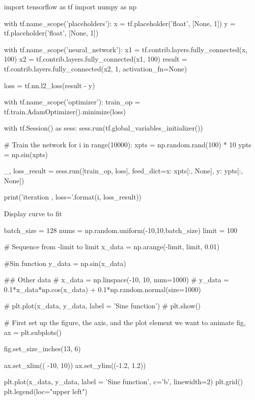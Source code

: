 %
%
%



import tensorflow as tf
import numpy as np

with tf.name_scope('placeholders'):
x = tf.placeholder('float', [None, 1])
y = tf.placeholder('float', [None, 1])

with tf.name_scope('neural_network'):
x1 = tf.contrib.layers.fully_connected(x, 100)
x2 = tf.contrib.layers.fully_connected(x1, 100)
result = tf.contrib.layers.fully_connected(x2, 1,
activation_fn=None)

loss = tf.nn.l2_loss(result - y)

with tf.name_scope('optimizer'):
train_op = tf.train.AdamOptimizer().minimize(loss)

with tf.Session() as sess:
sess.run(tf.global_variables_initializer())

# Train the network
for i in range(10000):
xpts = np.random.rand(100) * 10
ypts = np.sin(xpts)

_, loss_result = sess.run([train_op, loss],
feed_dict={x: xpts[:, None],
    y: ypts[:, None]})

print('iteration {}, loss={}'.format(i, loss_result))


Display curve to fit

batch_size = 128
nums = np.random.uniform(-10,10,batch_size)
limit = 100

# Sequence from -limit to limit
x_data = np.arange(-limit, limit, 0.01)

#Sin function
y_data = np.sin(x_data)


## Other data
# x_data = np.linspace(-10, 10, num=1000)
# y_data = 0.1*x_data*np.cos(x_data) + 0.1*np.random.normal(size=1000)


# plt.plot(x_data, y_data, label = 'Sine function')
# plt.show()






# First set up the figure, the axis, and the plot element we want to animate
fig, ax = plt.subplots()

fig.set_size_inches(13, 6)

ax.set_xlim(( -10, 10))
ax.set_ylim((-1.2, 1.2))

plt.plot(x_data, y_data, label = 'Sine function', c='b', linewidth=2)
plt.grid()
plt.legend(loc="upper left")


